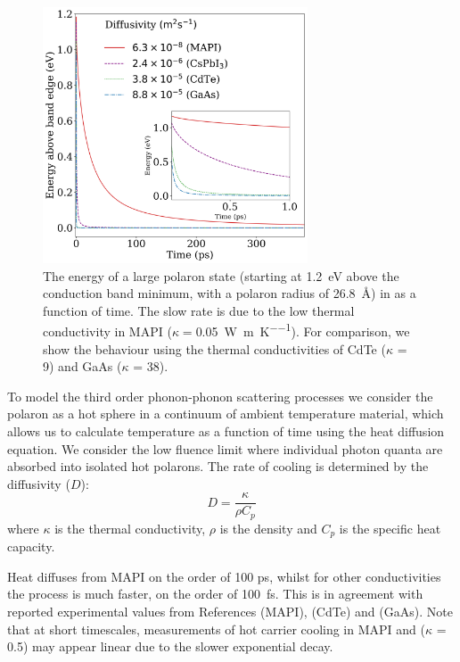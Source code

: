 \begin{table}
\begin{figure}[h]
\centering
  \includegraphics[width=0.7\textwidth]{figures/ch5/f4.png}
  \caption[Hot carrier cooling rate]{The energy of a large polaron state (starting at \SI{1.2}{\electronvolt} above the conduction band minimum, with a polaron radius of \SI{26.8}{\angstrom}) 
  in  as a function of time.
  The slow rate is due to the low thermal conductivity in MAPI ($\kappa=$\SI{0.05}{\watt\per\metre\per\K}). 
  For comparison, we show the behaviour using the thermal conductivities of 
  CdTe ($\kappa$ = 9) and GaAs ($\kappa$ = 38). }
  \label{ch5TemperatureTime}
\end{figure}

To model the third order phonon-phonon scattering processes we consider the polaron as a hot sphere in a continuum of ambient temperature material, which allows us to calculate temperature as a function of time using the heat diffusion equation.
We consider the low fluence limit where individual photon quanta are absorbed into isolated hot polarons.
The rate of cooling is determined by the diffusivity ($D$): 
\begin{equation}
    D= \frac{\kappa}{\rho C_p}
\end{equation} 
where $\kappa$ is the thermal conductivity, $\rho$ is the density and $C_p$ is the specific heat capacity. 

Heat diffuses from MAPI on the order of 100 ps, whilst for other conductivities the process is much faster, on the order of \SI{100}{\femto\second}. 
This is in agreement with reported experimental values from References \cite{Klein2016} (MAPI), \cite{Zhong2017} (CdTe) and \cite{Rosenwaks1993} (GaAs). 
Note that at short timescales, measurements of hot carrier cooling in MAPI and  ($\kappa$ = 0.5) may appear linear due to the slower exponential decay.


\end{table}
